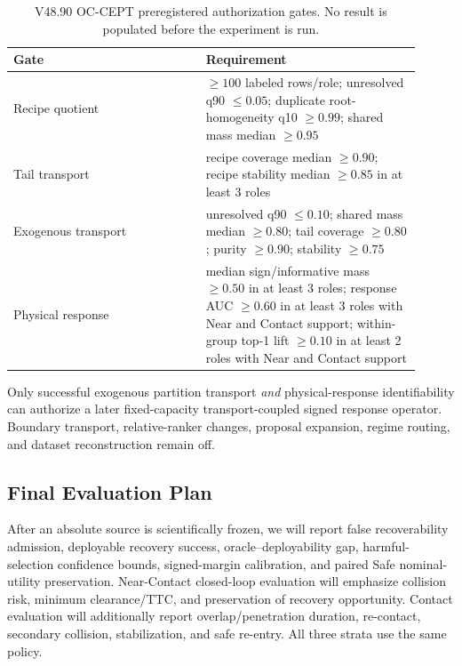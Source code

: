 \documentclass[conference]{IEEEtran}
\begin{document}
\begin{table}[t]
\centering
\caption{V48.90 OC-CEPT preregistered authorization gates. No result is populated before the experiment is run.}
\label{tab:cept_gates}
\begin{tabular}{p{0.43\linewidth}p{0.48\linewidth}}
\toprule
Gate & Requirement \\
\midrule
Recipe quotient & $\ge100$ labeled rows/role; unresolved q90 $\le0.05$; duplicate root-homogeneity q10 $\ge0.99$; shared mass median $\ge0.95$ \\
Tail transport & recipe coverage median $\ge0.90$; recipe stability median $\ge0.85$ in at least 3 roles \\
Exogenous transport & unresolved q90 $\le0.10$; shared mass median $\ge0.80$; tail coverage $\ge0.80$; purity $\ge0.90$; stability $\ge0.75$ \\
Physical response & median sign/informative mass $\ge0.50$ in at least 3 roles; response AUC $\ge0.60$ in at least 3 roles with Near and Contact support; within-group top-1 lift $\ge0.10$ in at least 2 roles with Near and Contact support \\
\bottomrule
\end{tabular}
\end{table}

Only successful exogenous partition transport \emph{and} physical-response identifiability can authorize a later fixed-capacity transport-coupled signed response operator. Boundary transport, relative-ranker changes, proposal expansion, regime routing, and dataset reconstruction remain off.

\subsection{Final Evaluation Plan}
\label{subsec:metrics}
After an absolute source is scientifically frozen, we will report false recoverability admission, deployable recovery success, oracle--deployability gap, harmful-selection confidence bounds, signed-margin calibration, and paired Safe nominal-utility preservation. Near-Contact closed-loop evaluation will emphasize collision risk, minimum clearance/TTC, and preservation of recovery opportunity. Contact evaluation will additionally report overlap/penetration duration, re-contact, secondary collision, stabilization, and safe re-entry. All three strata use the same policy.
\end{document}
